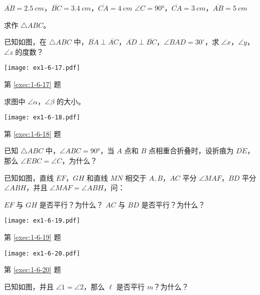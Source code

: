 \begin{Exercise}[复习题]
\begin{question}
\begin{tasks}
		\task $\overline{AB}=\qty{2.5}{cm}$，$\overline{BC}=\qty{3.4}{cm}$，$\overline{CA}=\qty{4}{cm}$
		\task $\angle C=\ang{90}$，$\overline{CA}=\qty{3}{cm}$，$\overline{AB}=\qty{5}{cm}$
	\end{tasks}
	求作 $\triangle ABC$。
	\item\label{exec:1-6-17} 已知如图，在 $\triangle ABC$ 中，$\overline{BA}\perp \overline{AC}$，$\overline{AD}\perp \overline{BC}$，$\angle BAD=30^{\circ}$，求 $\angle x$，$\angle y$，$\angle z$ 的度数？
	\begin{figurehere}
		\begin{minipage}{\linewidth}\centering
		\texttt{[image: ex1-6-17.pdf]}
		\caption*{第 \ref{exec:1-6-17} 题}
		\end{minipage}
	\end{figurehere}
  \item\label{exec:1-6-18} 求图中 $\angle\alpha$，$\angle\beta$ 的大小。
  \begin{figurehere}
		\begin{minipage}{\linewidth}\centering
		\texttt{[image: ex1-6-18.pdf]}
		\caption*{第 \ref{exec:1-6-18} 题}
		\end{minipage}
	\end{figurehere}
	\item\label{exec:1-6-19} 已知 $\triangle ABC$ 中，$\angle ABC=\ang{90}$，当 $A$ 点和 $B$ 点相重合折叠时，设折痕为 $\overline{DE}$，那么 $\angle EBC=\angle C$，为什么？
	\item\label{exec:1-6-20} 已知如图，直线 $EF$，$GH$ 和直线 $MN$ 相交于 $A,B$，$AC$ 平分 $\angle MAF$，$BD$ 平分 $\angle ABH$，并且 $\angle MAF=\angle ABH$，问：
	\begin{tasks}
		\task $EF$ 与 $GH$ 是否平行？为什么？
		\task $AC$ 与 $BD$ 是否平行？为什么？
	\end{tasks}
	\begin{figurehere}
		\begin{minipage}[b]{0.48\linewidth}
			\centering
			\texttt{[image: ex1-6-19.pdf]}
			\caption*{第 \ref{exec:1-6-19} 题}
		\end{minipage}
		\begin{minipage}[b]{0.48\linewidth}
			\centering
			\texttt{[image: ex1-6-20.pdf]}
			\caption*{第 \ref{exec:1-6-20} 题}
		\end{minipage}
	\end{figurehere}
	\item\label{exec:1-6-21} 已知如图，并且 $\angle 1=\angle 2$，那么 $\ell$ 是否平行 $m$？为什么？
	\begin{figurehere}

\end{figurehere}
\end{question}
\end{Exercise}
